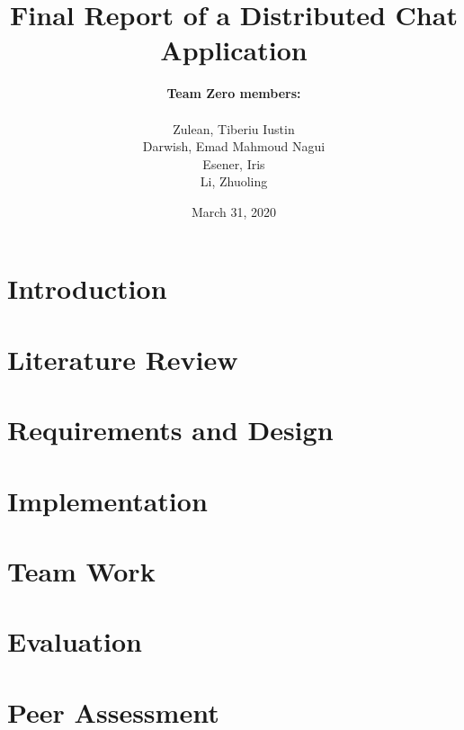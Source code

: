 \documentclass[11pt,a4paper]{report}
\title{\textbf{Final Report of a Distributed Chat Application}}
\author{\textbf{Team Zero members:} \\
		\\Zulean, Tiberiu Iustin 
		\\Darwish, Emad Mahmoud Nagui 
		\\ Esener, Iris
		\\ Li, Zhuoling
}
\date{March 31, 2020}
\begin{document}



\maketitle
\newpage

\tableofcontents
\newpage




\setcounter{page}{1}

\chapter{Introduction}
\label{introduction}



\chapter{Literature Review}
\label{lit-review}



\chapter{Requirements and Design}
\label{requirements and design}




\chapter{Implementation}
\label{implementation}



\chapter{Team Work}
\label{teamwork}



\chapter{Evaluation}
\label{evaluation}



\chapter{Peer Assessment}
\label{peer assessment}


\newpage
\printbibliography

%
%
\end{document}
